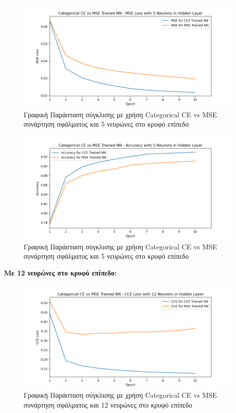 \documentclass[12pt,a4paper]{article}
\begin{document}
\begin{figure}[H]
	\includegraphics[width=\textwidth]{2. CCE vs MSE - MSE Loss - 5 Neurons.png}
	\caption{Γραφική Παράσταση σύγκλισης με χρήση Categorical CE vs MSE συνάρτηση σφάλματος και 5 νευρώνες στο κρυφό επίπεδο}
\end{figure}

\begin{figure}[H]
	\includegraphics[width=\textwidth]{3. CCE vs MSE - Accuracy - 5 Neurons.png}
	\caption{Γραφική Παράσταση σύγκλισης με χρήση Categorical CE vs MSE συνάρτηση σφάλματος και 5 νευρώνες στο κρυφό επίπεδο}
\end{figure}

\textbf{Με 12 νευρώνες στο κρυφό επίπεδο:}

\begin{figure}[H]
	\includegraphics[width=\textwidth]{4. CCE vs MSE - CCE Loss - 12 Neurons.png}
	\caption{Γραφική Παράσταση σύγκλισης με χρήση Categorical CE vs MSE συνάρτηση σφάλματος και 12 νευρώνες στο κρυφό επίπεδο}
\end{figure}
\end{document}
